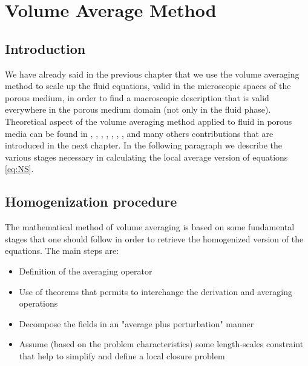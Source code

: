 \chapter{Volume Average Method}
\label{ch:vans}


\section{Introduction}

We have already said in the previous chapter that we use the volume averaging method to scale up the fluid equations, valid in the microscopic spaces of the porous medium, in order to find a macroscopic description that is valid everywhere in the porous medium domain (not only in the fluid phase).
Theoretical aspect of the volume averaging method applied to fluid in porous media can be found in \citet{whitaker2013method}, \citet{whitaker1986flow}, \citet{whitaker1996forchheimer}, \citet{quintard1994transport1}, \citet{quintard1994transport2}, \citet{quintard1994transport3}, \citet{quintard1994transport4}, \citet{quintard1994transport5} and many others contributions that are introduced in the next chapter.
In the following paragraph we describe the various stages necessary in calculating the local average version of equations \eqref{eq:NS}.

\section{Homogenization procedure}
The mathematical method of volume averaging is based on some fundamental stages that one should follow in order to retrieve the homogenized version of the equations.
The main steps are:
\begin{itemize}
\item Definition of the averaging operator
\item Use of theorems that permits to interchange the derivation and averaging operations
\item Decompose the fields in an "average plus perturbation" manner
\item Assume (based on the problem characteristics) some length-scales constraint that help to simplify and define a local closure  problem
\end{itemize}

